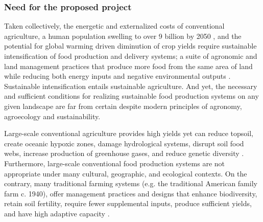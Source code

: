 \documentclass[12pt, letterpaper]{article}
\begin{document}
\subsubsection*{Need for the proposed project}
Taken collectively, the energetic and externalized costs of conventional agriculture, a human population swelling to over 9 billion by 2050 \citep{godfray_food_2010}, and the potential for global warming driven diminution of crop yields \citep{parry_effects_2004, zhao_drought-induced_2010} require sustainable intensification of food production and delivery systems; a suite of agronomic and land management practices that produce more food from the same area of land while reducing both energy inputs and negative environmental outputs \citep{barnosky_approaching_2012, schmidhuber_global_2007, eigenbrod_impact_2011, dodds_human_2013, rogers_facing_2008, lobell_climate_2011, wada_global_2010, tilman_forecasting_2001}. Sustainable intensification entails sustainable agriculture. And yet, the necessary and sufficient conditions for realizing sustainable food production systems on any given landscape are far from certain despite modern principles of agronomy, agroecology and sustainability. 

Large-scale conventional agriculture provides high yields yet can reduce topsoil, create oceanic hypoxic zones, damage hydrological systems, disrupt soil food webs, increase production of greenhouse gases, and reduce genetic diversity \citep{pearce_blueprint_2000, pretty_policy_2001, tilman_agricultural_2002, chameides_growth_1994, horrigan_how_2002, gliessman_agroecology:_2015}. Furthermore, large-scale conventional food production systems are not appropriate under many cultural, geographic, and ecological contexts.  On the contrary,  many traditional farming systems (e.g. the traditional American family farm c. 1940), offer management practices and designs that enhance biodiversity, retain soil fertility, require fewer supplemental inputs, produce sufficient yields, and have high adaptive capacity \citep{altieri_agroecology_2015, nicholls_plant_2013, gliessman_agroecology:_2015}.
\end{document}
